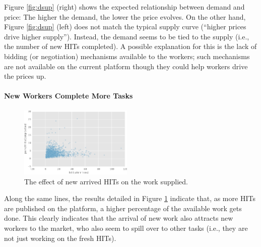 Figure \ref{fig:dsup} (right) shows the expected relationship between demand and price: The higher the demand, the lower the price evolves. On the other hand, Figure \ref{fig:dsup} (left)  does not match the typical supply curve (``higher prices drive higher supply''). Instead, the demand seems to be tied to the supply (i.e., the number of new HITs completed). A possible explanation for this is the lack of bidding (or negotiation) mechanisms available to the workers; such mechanisms are not available on the current platform though they could help workers drive the prices up. 

\paragraph{New Workers Complete More Tasks}
\begin{figure}[tb]
	\centering
		\includegraphics[width=0.48\textwidth]{figures/percHitsCompleted}
	\caption{The effect of new arrived HITs on the work  supplied.}
	\label{fig:perc_hits_completed}
\end{figure}
Along the same lines, the results detailed in Figure \ref{fig:perc_hits_completed} indicate that, as more HITs are published on the platform, a higher percentage of the available work gets done. 
This clearly indicates that the arrival of new work also attracts new workers
to the market, who also seem to spill over to other tasks (i.e., they are not just working on the fresh HITs).

